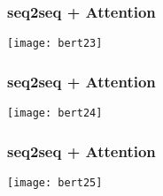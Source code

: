 \begin{frame}[fragile]\frametitle{seq2seq + Attention}





\begin{center}
\texttt{[image: bert23]}
\end{center}	

\end{frame}

\begin{frame}[fragile]\frametitle{seq2seq + Attention}





\begin{center}
\texttt{[image: bert24]}
\end{center}	

\end{frame}

\begin{frame}[fragile]\frametitle{seq2seq + Attention}

\begin{center}
\texttt{[image: bert25]}
\end{center}	

\end{frame}



